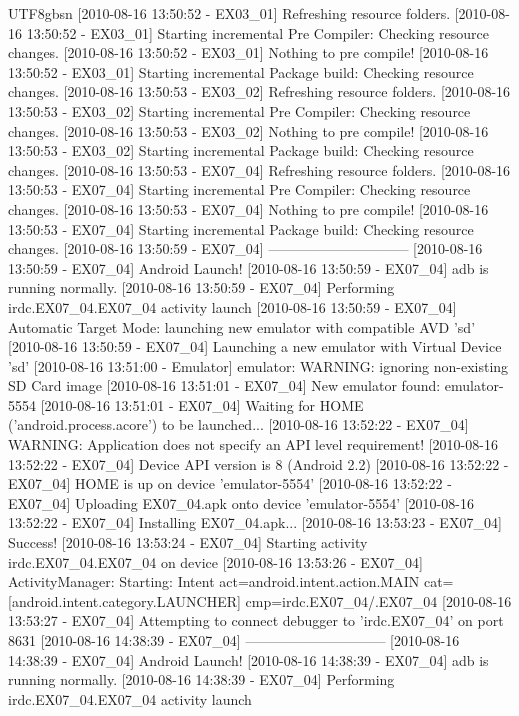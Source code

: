 \documentclass{book}
\begin{document}
\begin{CJK}{UTF8}{gbsn}
[2010-08-16 13:50:52 - EX03_01] Refreshing resource folders.
[2010-08-16 13:50:52 - EX03_01] Starting incremental Pre Compiler: Checking resource changes.
[2010-08-16 13:50:52 - EX03_01] Nothing to pre compile!
[2010-08-16 13:50:52 - EX03_01] Starting incremental Package build: Checking resource changes.
[2010-08-16 13:50:53 - EX03_02] Refreshing resource folders.
[2010-08-16 13:50:53 - EX03_02] Starting incremental Pre Compiler: Checking resource changes.
[2010-08-16 13:50:53 - EX03_02] Nothing to pre compile!
[2010-08-16 13:50:53 - EX03_02] Starting incremental Package build: Checking resource changes.
[2010-08-16 13:50:53 - EX07_04] Refreshing resource folders.
[2010-08-16 13:50:53 - EX07_04] Starting incremental Pre Compiler: Checking resource changes.
[2010-08-16 13:50:53 - EX07_04] Nothing to pre compile!
[2010-08-16 13:50:53 - EX07_04] Starting incremental Package build: Checking resource changes.
[2010-08-16 13:50:59 - EX07_04] ------------------------------
[2010-08-16 13:50:59 - EX07_04] Android Launch!
[2010-08-16 13:50:59 - EX07_04] adb is running normally.
[2010-08-16 13:50:59 - EX07_04] Performing irdc.EX07_04.EX07_04 activity launch
[2010-08-16 13:50:59 - EX07_04] Automatic Target Mode: launching new emulator with compatible AVD 'sd'
[2010-08-16 13:50:59 - EX07_04] Launching a new emulator with Virtual Device 'sd'
[2010-08-16 13:51:00 - Emulator] emulator: WARNING: ignoring non-existing SD Card image
[2010-08-16 13:51:01 - EX07_04] New emulator found: emulator-5554
[2010-08-16 13:51:01 - EX07_04] Waiting for HOME ('android.process.acore') to be launched...
[2010-08-16 13:52:22 - EX07_04] WARNING: Application does not specify an API level requirement!
[2010-08-16 13:52:22 - EX07_04] Device API version is 8 (Android 2.2)
[2010-08-16 13:52:22 - EX07_04] HOME is up on device 'emulator-5554'
[2010-08-16 13:52:22 - EX07_04] Uploading EX07_04.apk onto device 'emulator-5554'
[2010-08-16 13:52:22 - EX07_04] Installing EX07_04.apk...
[2010-08-16 13:53:23 - EX07_04] Success!
[2010-08-16 13:53:24 - EX07_04] Starting activity irdc.EX07_04.EX07_04 on device 
[2010-08-16 13:53:26 - EX07_04] ActivityManager: Starting: Intent { act=android.intent.action.MAIN cat=[android.intent.category.LAUNCHER] cmp=irdc.EX07_04/.EX07_04 }
[2010-08-16 13:53:27 - EX07_04] Attempting to connect debugger to 'irdc.EX07_04' on port 8631
[2010-08-16 14:38:39 - EX07_04] ------------------------------
[2010-08-16 14:38:39 - EX07_04] Android Launch!
[2010-08-16 14:38:39 - EX07_04] adb is running normally.
[2010-08-16 14:38:39 - EX07_04] Performing irdc.EX07_04.EX07_04 activity launch

\end{CJK}
\end{document}
